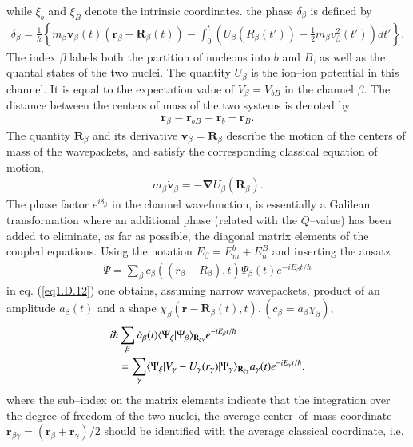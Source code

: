 \begin{subappendices}
while $\xi_b$ and $\xi_B$ denote the intrinsic coordinates. the phase $\delta_\beta$ is defined by
\begin{align}\label{eq1.D.16}
\delta_\beta=\frac{1}{\hbar}\left\{m_\beta\mathbf v_\beta(t)(\mathbf r_\beta-\mathbf R_\beta(t))-\int_0^t\left(U_\beta(R_\beta(t'))-\frac{1}{2}m_\beta v^2_\beta(t')\right)dt'\right\}.
\end{align}
The index $\beta$ labels both the partition of nucleons into $b$ and $B$, as well as the quantal states of the two nuclei. The quantity $U_\beta$ is the ion--ion potential in this channel. It is equal to the expectation value of $V_\beta=V_{bB}$ in the channel $\beta$. The distance between the centers of mass of the two systems is denoted by
\begin{align}\label{eq1.D.17}
\mathbf r_\beta=\mathbf r_{bB}=\mathbf r_b-\mathbf r_B.
\end{align}
The quantity $\mathbf R_\beta$ and its derivative $\mathbf v_\beta=\mathbf{\dot R}_\beta$ describe the motion of the centers of mass of the wavepackets, and satisfy the corresponding classical equation of motion,
\begin{align}\label{eq1.D.18}
m_\beta\mathbf{\dot v}_\beta=-\boldsymbol\nabla U_\beta(\mathbf R_\beta).
\end{align}
The phase factor $e^{i\delta_\beta}$ in the channel wavefunction, is essentially a Galilean transformation where an additional phase (related with the $Q$--value) has been added to eliminate, as far as possible, the diagonal matrix elements of the coupled equations. Using the notation $E_\beta=E_m^b+E_n^B$ and inserting the ansatz
\begin{align}\label{eq1.D.19}
\Psi=\sum_{\beta}c_\beta((r_\beta-R_\beta),t)\Psi_\beta(t)e^{-iE_\beta t/\hbar}
\end{align}
in eq. (\ref{eq1.D.12}) one obtains, assuming narrow wavepackets, product of an amplitude $a_\beta(t)$ and a shape $\chi_\beta(\mathbf r-\mathbf R_\beta(t),t), (c_\beta=a_\beta\chi_\beta)$,
\begin{align}\label{eq1.D.20}
\nonumber i\hbar & \sum_{\beta}\dot a_\beta(t)\langle {\Psi_\xi|\Psi_\beta} \rangle_{\mathbf R_{\xi\gamma}}e^{-iE_\beta t/\hbar}\\
&=\sum_{\gamma}\langle {\Psi_\xi|V_\gamma-U_\gamma(r_\gamma)|\Psi_\gamma} \rangle_{\mathbf R_{\xi\gamma}}a_\gamma(t)e^{-iE_\gamma t/\hbar}.
\end{align}
where the sub--index on the matrix elements indicate that the integration over the degree of freedom of the two nuclei, the average center--of--mass coordinate $\mathbf r_{\beta\gamma}=(\mathbf r_\beta+\mathbf r_\gamma)/2$ should be identified with the average classical coordinate, i.e.

\end{subappendices}
